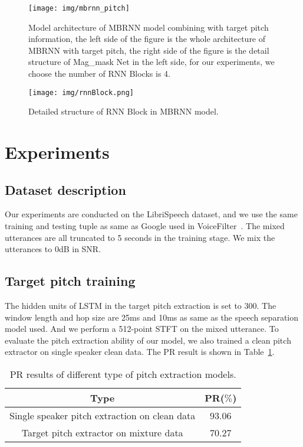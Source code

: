 \documentclass[
]{article}
\begin{document}
    \begin{figure}[t]
        \centering
        \texttt{[image: img/mbrnn\_pitch]}
        \caption{Model architecture of MBRNN model combining with target pitch information, the left side of the figure is the whole architecture of MBRNN with target pitch, the right side of the figure is the detail structure of Mag\_mask Net in the left side, for our experiments, we choose the number of RNN Blocks is 4.}
        \label{fig:mbrnn_pitch}
    \end{figure}

    \begin{figure}[t]
        \centering
        \texttt{[image: img/rnnBlock.png]}
        \caption{Detailed structure of RNN Block in MBRNN model.}
        \label{fig:rnnBlock}
    \end{figure}


    \section{Experiments}
    \label{sec:exp_result}

    \subsection{Dataset description}
    \label{subsec:dataset}

    Our experiments are conducted on the LibriSpeech dataset, and we use the same training and testing tuple as same as Google used in VoiceFilter~\cite{voicefilter}. The mixed utterances are all truncated to 5 seconds in the training stage. We mix the utterances to 0dB in SNR.

    \subsection{Target pitch training}
    \label{subsec:target_pitch_training}

    The hidden units of LSTM in the target pitch extraction is set to 300. The window length and hop size are 25ms and 10ms as same as the speech separation model used. And we perform a 512-point STFT on the mixed utterance. To evaluate the pitch extraction ability of our model, we also trained a clean pitch extractor on single speaker clean data. The PR result is shown in Table~\ref{tab:pitch result}.

    \begin{table}[htbp]
        \centering
        \begin{tabular}{c|c}
            \toprule
            Type                                          & PR($\%$) \\
            \midrule
            Single speaker pitch extraction on clean data & 93.06    \\
            \midrule
            Target pitch extractor on mixture data        & 70.27    \\
            \bottomrule
        \end{tabular}
        \caption{PR results of different type of pitch extraction models.}
        \label{tab:pitch result}
    \end{table}
\end{document}
